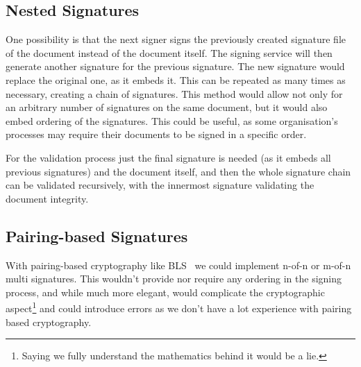 \subsection{Nested Signatures}
One possibility is that the next signer signs the previously created signature file of the document instead of the document itself.
The signing service will then generate another signature for the previous signature.
The new signature would replace the original one, as it embeds it.
This can be repeated as many times as necessary, creating a chain of signatures.
This method would allow not only for an arbitrary number of signatures on the same document,
but it would also embed ordering of the signatures.
This could be useful, as some organisation's processes may require their documents to be signed in a specific order.

For the validation process just the final signature is needed (as it embeds all previous signatures) and the document itself,
and then the whole signature chain can be validated recursively,
with the innermost signature validating the document integrity.

\subsection{Pairing-based Signatures}
With pairing-based cryptography like \gls{BLS}~\cite{bls} we could implement n-of-n or m-of-n multi signatures.
This wouldn't provide nor require any ordering in the signing process, and while much more elegant,
would complicate the cryptographic aspect\footnote{Saying we fully understand the mathematics behind it would be a lie.} and could introduce errors as we don't have a lot experience with pairing based cryptography.